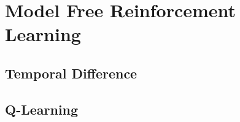 \section{Model Free Reinforcement Learning}
\label{sec:mf_rl}

\subsection{Temporal Difference}

\subsection{Q-Learning}
